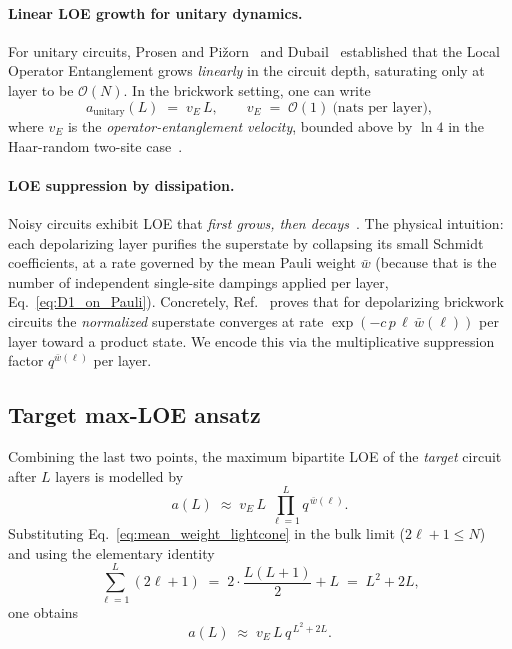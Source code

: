 \documentclass[%
 reprint,
superscriptaddress,
 amsmath,amssymb,
 aps,
]{revtex4-2}
\begin{document}
\paragraph*{Linear LOE growth for unitary dynamics.}
For unitary circuits, Prosen and Pi\v{z}orn~\cite{prosen2007operator} and Dubail~\cite{dubail2017entanglement} established that the Local Operator Entanglement grows \emph{linearly} in the circuit depth, saturating only at layer to be $\mathcal{O}(N)$. In the brickwork setting, one can write
\begin{equation}
    a_{\text{unitary}}(L) \;=\; v_E \,L,\qquad v_E \;=\; \mathcal{O}(1)\ \text{(nats per layer)},
    \label{eq:linear_LOE}
\end{equation}
where $v_E$ is the \emph{operator-entanglement velocity}, bounded above by $\ln 4$ in the Haar-random two-site case~\cite{zhou2020entanglement}.

\paragraph*{LOE suppression by dissipation.}
Noisy circuits exhibit LOE that \emph{first grows, then decays}~\cite{LOE_EE_Decreasing1,noh2020efficient}. The physical intuition: each depolarizing layer purifies the superstate by collapsing its small Schmidt coefficients, at a rate governed by the mean Pauli weight $\bar w$ (because that is the number of independent single-site dampings applied per layer, Eq.~\eqref{eq:D1_on_Pauli}). Concretely, Ref.~\cite{noh2020efficient} proves that for depolarizing brickwork circuits the \emph{normalized} superstate converges at rate $\exp(-c\,p\,\ell\,\bar w(\ell))$ per layer toward a product state. We encode this via the multiplicative suppression factor $q^{\bar w(\ell)}$ per layer.

\subsection{Target max-LOE ansatz}

Combining the last two points, the maximum bipartite LOE of the \emph{target} circuit after $L$ layers is modelled by
\begin{equation}
    \boxed{\;a(L) \;\approx\; v_E\, L \;\prod_{\ell=1}^{L} q^{\,\bar w(\ell)}.\;}
    \label{eq:aL_ansatz_new}
\end{equation}
Substituting Eq.~\eqref{eq:mean_weight_lightcone} in the bulk limit ($2\ell+1\le N$) and using the elementary identity
\begin{equation}
    \sum_{\ell=1}^{L}(2\ell+1) \;=\; 2\cdot\frac{L(L+1)}{2}+L \;=\; L^2 + 2L,
    \label{eq:exponent_sum}
\end{equation}
one obtains
\begin{equation}
    a(L) \;\approx\; v_E\, L\, q^{\,L^2+2L}.
    \label{eq:aL_closed}
\end{equation}
\end{document}
